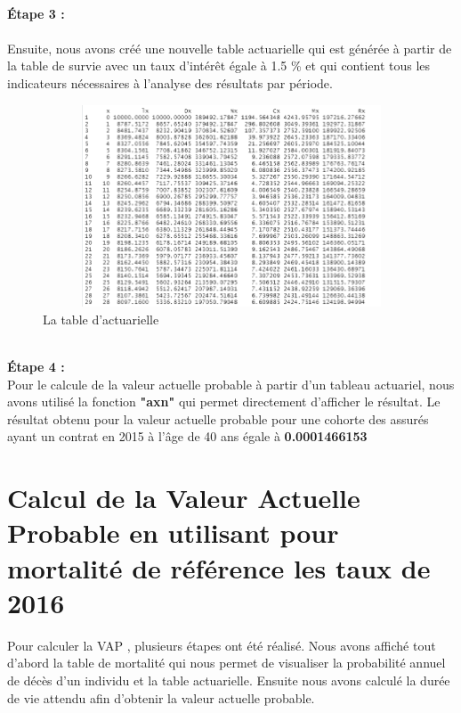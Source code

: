 \documentclass[french]{report}
\begin{document}
\\ \textbf{ Étape 3 :} \\
\\
Ensuite, nous avons créé une nouvelle table actuarielle qui est générée à partir de la table de survie avec un taux d'intérêt égale à 1.5 \% et qui contient tous les indicateurs nécessaires à l'analyse des résultats par période.
\begin{figure}[hhhhhhhh!]
    \centering
    \includegraphics[width=12cm, height=6cm]{8.png}
    \caption{ La table d'actuarielle}
\end{figure}


\\ \textbf{ Étape 4 :} \\

Pour le calcule de la valeur actuelle probable à partir d'un tableau actuariel, nous avons utilisé la fonction \textbf{"axn"} qui permet directement d'afficher le résultat.
\newline
\newline
Le résultat obtenu pour la valeur actuelle probable  pour une cohorte des assurés ayant un contrat en 2015 à l'âge de 40 ans égale à \textbf{0.0001466153 }

\newpage
\section{Calcul de la Valeur Actuelle Probable en utilisant pour mortalité de référence les taux de 2016}
Pour calculer la VAP , plusieurs étapes ont été réalisé.
Nous avons affiché tout d'abord la  table de mortalité qui nous permet de visualiser la probabilité annuel de décès d'un individu et la table actuarielle. Ensuite nous avons calculé la durée de vie attendu afin d'obtenir la valeur actuelle probable.
\newline  
\end{document}

